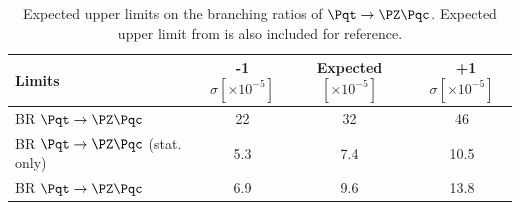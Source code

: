 \begin{table}[htbp]
	\centering
	\begin{tabular}{lccc} 
		\toprule
		\textbf{Limits} & \textbf{-1$\sigma [\times 10^{-5}]$} & \textbf{Expected  $[\times 10^{-5}]$} & \ \textbf{+1$\sigma [\times 10^{-5}]$}  \\
		\midrule
		BR $\Pqt\rightarrow\PZ\Pqc$ \cite{TOPQ-2017-06} & 22 & 32& 46 \\
		BR $\Pqt\rightarrow\PZ\Pqc$  (stat. only)                 & 5.3 & 7.4 & 10.5 \\
		BR $\Pqt\rightarrow\PZ\Pqc$                                    & 6.9 & 9.6 & 13.8\\		
		\bottomrule
	\end{tabular}
	\caption{
	Expected upper limits on the branching ratios of $\Pqt\rightarrow\PZ\Pqc$.
	Expected upper limit from \cite{TOPQ-2017-06} is also included for reference.
}%
\label{tab:results:limits}
\end{table}

